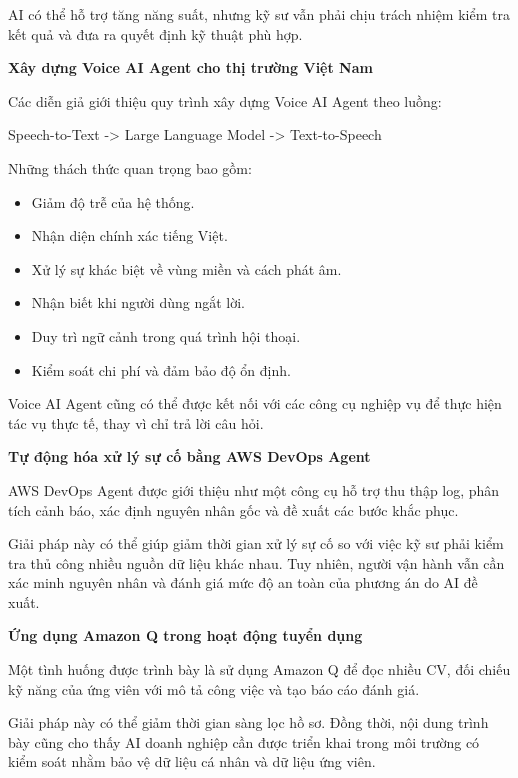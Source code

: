 AI có thể hỗ trợ tăng năng suất, nhưng kỹ sư vẫn phải chịu trách nhiệm
kiểm tra kết quả và đưa ra quyết định kỹ thuật phù hợp.

\vspace{0.5em}\noindent\textbf{Xây dựng Voice AI Agent cho thị trường Việt
Nam}\par

Các diễn giả giới thiệu quy trình xây dựng Voice AI Agent theo luồng:

Speech-to-Text -\textgreater{} Large Language Model -\textgreater{}
Text-to-Speech

Những thách thức quan trọng bao gồm:

\begin{itemize}
\tightlist
\item
  Giảm độ trễ của hệ thống.
\item
  Nhận diện chính xác tiếng Việt.
\item
  Xử lý sự khác biệt về vùng miền và cách phát âm.
\item
  Nhận biết khi người dùng ngắt lời.
\item
  Duy trì ngữ cảnh trong quá trình hội thoại.
\item
  Kiểm soát chi phí và đảm bảo độ ổn định.
\end{itemize}

Voice AI Agent cũng có thể được kết nối với các công cụ nghiệp vụ để
thực hiện tác vụ thực tế, thay vì chỉ trả lời câu hỏi.

\vspace{0.5em}\noindent\textbf{Tự động hóa xử lý sự cố bằng AWS DevOps
Agent}\par

AWS DevOps Agent được giới thiệu như một công cụ hỗ trợ thu thập log,
phân tích cảnh báo, xác định nguyên nhân gốc và đề xuất các bước khắc
phục.

Giải pháp này có thể giúp giảm thời gian xử lý sự cố so với việc kỹ sư
phải kiểm tra thủ công nhiều nguồn dữ liệu khác nhau. Tuy nhiên, người
vận hành vẫn cần xác minh nguyên nhân và đánh giá mức độ an toàn của
phương án do AI đề xuất.

\vspace{0.5em}\noindent\textbf{Ứng dụng Amazon Q trong hoạt động tuyển
dụng}\par

Một tình huống được trình bày là sử dụng Amazon Q để đọc nhiều CV, đối
chiếu kỹ năng của ứng viên với mô tả công việc và tạo báo cáo đánh giá.

Giải pháp này có thể giảm thời gian sàng lọc hồ sơ. Đồng thời, nội dung
trình bày cũng cho thấy AI doanh nghiệp cần được triển khai trong môi
trường có kiểm soát nhằm bảo vệ dữ liệu cá nhân và dữ liệu ứng viên.

